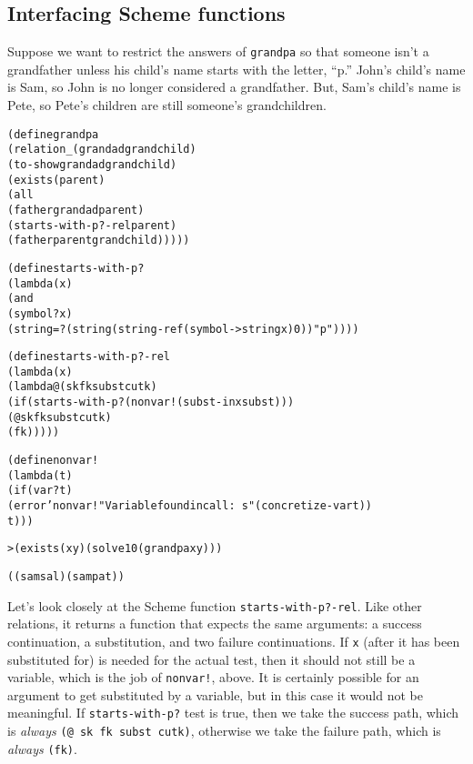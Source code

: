 \subsection{Interfacing Scheme functions}

Suppose we want to restrict the answers of \texttt{grandpa} so that
someone isn't a grandfather unless his child's name starts with the
letter, ``p.''  John's child's name is Sam, so John is no
longer considered a grandfather. But, Sam's child's name is
Pete, so Pete's children are still someone's grandchildren.
\newpage
\begin{alltt}
(define grandpa
  (relation _ (grandad grandchild)
    (to-show grandad grandchild)
    (exists (parent)
      (all 
        (father grandad parent) 
        (starts-with-p?-rel parent)
        (father parent grandchild)))))
\end{alltt}

\begin{alltt}
(define starts-with-p?
  (lambda (x)
    (and
      (symbol? x)
      (string=? (string (string-ref (symbol->string x) 0)) "p"))))

(define starts-with-p?-rel
  (lambda (x)
    (lambda@ (sk fk subst cutk)
      (if (starts-with-p? (nonvar! (subst-in x subst)))
        (@ sk fk subst cutk)
        (fk)))))

(define nonvar!
  (lambda (t)
    (if (var? t)
      (error 'nonvar! "Variable found in call: ~s" (concretize-var t))
      t)))
\end{alltt}

\begin{alltt}
> (exists (x y) (solve 10 (grandpa x y)))

((sam sal) (sam pat))
\end{alltt}

Let's look closely at the Scheme function \texttt{starts-with-p?-rel}.
Like other relations, it returns a function that expects the same
arguments: a success continuation, a substitution, and two failure
continuations.  If \texttt{x} (after it has been substituted for) is
needed for the actual test, then it should not still be a variable,
which is the job of \texttt{nonvar!}, above.  It is certainly possible
for an argument to get substituted by a variable, but in this case it
would not be meaningful. If \texttt{starts-with-p?} test is true, then
we take the success path, which is \emph{always} \texttt{(@ sk fk
subst cutk)}, otherwise we take the failure path, which is
\emph{always} \texttt{(fk)}.

